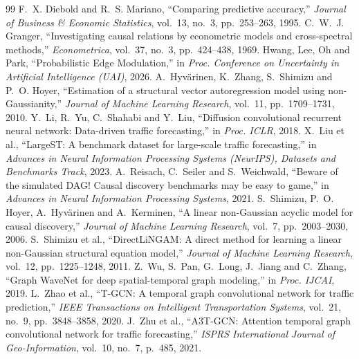 \documentclass[MTech]{ugthesis}
\begin{document}
\begin{thebibliography}{99}
 F.~X. Diebold and R.~S. Mariano, ``Comparing predictive accuracy,'' \emph{Journal of Business \& Economic Statistics}, vol.~13, no.~3, pp.~253--263, 1995.
 C.~W.~J. Granger, ``Investigating causal relations by econometric models and cross-spectral methods,'' \emph{Econometrica}, vol.~37, no.~3, pp.~424--438, 1969.
 Hwang, Lee, Oh and Park, ``Probabilistic Edge Modulation,'' in \emph{Proc. Conference on Uncertainty in Artificial Intelligence (UAI)}, 2026.
 A.~Hyv\"arinen, K.~Zhang, S.~Shimizu and P.~O. Hoyer, ``Estimation of a structural vector autoregression model using non-Gaussianity,'' \emph{Journal of Machine Learning Research}, vol.~11, pp.~1709--1731, 2010.
 Y.~Li, R.~Yu, C.~Shahabi and Y.~Liu, ``Diffusion convolutional recurrent neural network: Data-driven traffic forecasting,'' in \emph{Proc. ICLR}, 2018.
 X.~Liu et al., ``LargeST: A benchmark dataset for large-scale traffic forecasting,'' in \emph{Advances in Neural Information Processing Systems (NeurIPS), Datasets and Benchmarks Track}, 2023.
 A.~Reisach, C.~Seiler and S.~Weichwald, ``Beware of the simulated DAG! Causal discovery benchmarks may be easy to game,'' in \emph{Advances in Neural Information Processing Systems}, 2021.
 S.~Shimizu, P.~O. Hoyer, A.~Hyv\"arinen and A.~Kerminen, ``A linear non-Gaussian acyclic model for causal discovery,'' \emph{Journal of Machine Learning Research}, vol.~7, pp.~2003--2030, 2006.
 S.~Shimizu et al., ``DirectLiNGAM: A direct method for learning a linear non-Gaussian structural equation model,'' \emph{Journal of Machine Learning Research}, vol.~12, pp.~1225--1248, 2011.
 Z.~Wu, S.~Pan, G.~Long, J.~Jiang and C.~Zhang, ``Graph WaveNet for deep spatial-temporal graph modeling,'' in \emph{Proc. IJCAI}, 2019.
 L.~Zhao et al., ``T-GCN: A temporal graph convolutional network for traffic prediction,'' \emph{IEEE Transactions on Intelligent Transportation Systems}, vol.~21, no.~9, pp.~3848--3858, 2020.
 J.~Zhu et al., ``A3T-GCN: Attention temporal graph convolutional network for traffic forecasting,'' \emph{ISPRS International Journal of Geo-Information}, vol.~10, no.~7, p.~485, 2021.
\end{thebibliography}
\end{document}
